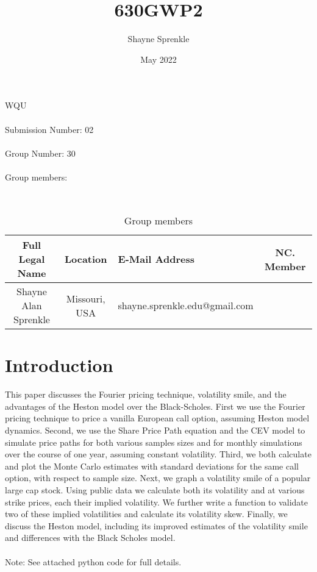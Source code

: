 \documentclass{article}
\title{630GWP2}
\author { Shayne Sprenkle}
\date{May 2022}
\begin{document}
WQU
\\\\
Submission Number: 02
\\\\
Group Number: 30
\\\\
Group members:
\begin{table}[ht]

\renewcommand{\arraystretch}{2.5}{
\\
\begin{tabular}{|c|c|l|c|}
\hline
\textbf{Full Legal Name} & 
\textbf{Location} & 
\textbf{E-Mail Address} & 
\textbf{NC. Member}
\\
\hline
Shayne Alan Sprenkle  & Missouri, USA & shayne.sprenkle.edu@gmail.com &  
\\
\hline
\end{tabular}}
\caption{Group members}
\end{table}

\maketitle

\section{Introduction}

This paper discusses the Fourier pricing technique, volatility smile, and the advantages of the Heston model over the Black-Scholes.  First we use the Fourier pricing technique to price a vanilla European call option, assuming Heston model dynamics.  Second, we use the Share Price Path equation and the CEV model to simulate price paths for both various samples sizes and for monthly simulations over the course of one year, assuming constant volatility.  Third, we both calculate and plot the Monte Carlo estimates with standard deviations for the same call option, with respect to sample size.
Next, we graph a volatility smile of a popular large cap stock. Using public data we calculate both its volatility and at various strike prices, each their implied volatility. We further write a function to validate two of these implied volatilities and calculate its volatility skew.
Finally, we discuss the Heston model, including its improved estimates of the volatility smile and differences with the Black Scholes model.
\\\\
Note: See attached python code for full details.
\end{document}
